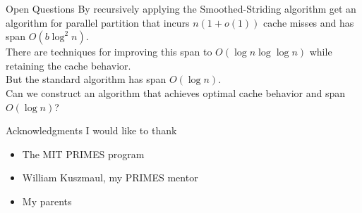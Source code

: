 \documentclass[xcolor=x11names, svgnames, rgb]{beamer}
\begin{document}
\begin{frame}[t]{Open Questions}
	By recursively applying the Smoothed-Striding algorithm get an algorithm for parallel partition that incurs $n(1+o(1))$ cache misses and has span $O(b\log^2 n)$.\\
	There are techniques for improving this span to $O(\log n\log\log n)$ while retaining the cache behavior.\\
	But the standard algorithm has span $O(\log n)$.\\
	\vspace{1cm}
	Can we construct an algorithm that achieves optimal cache behavior and span $O(\log n)$?
\end{frame}

\begin{frame}[t]{Acknowledgments}
I would like to thank
\begin{itemize}
	\item {The MIT PRIMES program}
	\item {William Kuszmaul, my PRIMES mentor}
	\item {My parents}
\end{itemize}
\end{frame}
\end{document}
